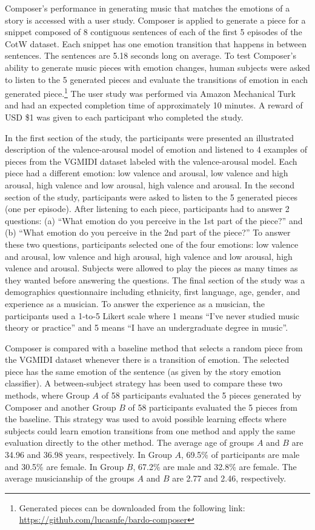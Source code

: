 Composer's performance in generating music that matches the emotions of a story is accessed with a user study. Composer is applied to generate a piece for a snippet composed of 8 contiguous sentences of each of the first 5 episodes of the CotW dataset. Each snippet has one emotion transition that happens in between sentences. The sentences are 5.18 seconds long on average. To test Composer's ability to generate music pieces with emotion changes, human subjects were asked to listen to the 5 generated pieces and evaluate the transitions of emotion in each generated piece.\footnote{Generated pieces can be downloaded from the following link: \url{https://github.com/lucasnfe/bardo-composer}} The user study was performed via Amazon Mechanical Turk and had an expected completion time of approximately 10 minutes. A reward of USD \$1 was given to each participant who completed the study.

In the first section of the study, the participants were presented an illustrated description of the valence-arousal model of emotion and listened to 4 examples of pieces from the VGMIDI dataset labeled with the valence-arousal model. Each piece had a different emotion: low valence and arousal, low valence and high arousal, high valence and low arousal, high valence and arousal. In the second section of the study, participants were asked to listen to the 5 generated pieces (one per episode). After listening to each piece, participants had to answer 2 questions: (a) ``What emotion do you perceive in the 1st part of the piece?'' and (b) ``What emotion do you perceive in the 2nd part of the piece?'' To answer these two questions, participants selected one of the four emotions: low valence and arousal, low valence and high arousal, high valence and low arousal, high valence and arousal. Subjects were allowed to play the pieces as many times as they wanted before answering the questions.
The final section of the study was a demographics questionnaire including ethnicity, first language, age, gender, and experience as a musician. To answer the experience as a musician, the participants used a 1-to-5 Likert scale where 1 means ``I've never studied music theory or practice'' and 5 means ``I have an undergraduate degree in music''.

Composer is compared with a baseline method that selects a random piece from the VGMIDI dataset whenever there is a transition of emotion. The selected piece has the same emotion of the sentence (as given by the story emotion classifier). A between-subject strategy has been used to compare these two methods, where Group $A$ of 58 participants evaluated the 5 pieces generated by Composer and another Group $B$ of 58 participants evaluated the 5 pieces from the baseline. This strategy was used to avoid possible learning effects where subjects could learn emotion transitions from one method and apply the same evaluation directly to the other method. The average age of groups $A$ and $B$ are 34.96 and 36.98 years, respectively. In Group $A$, 69.5\% of participants are male and 30.5\% are female. In Group $B$, 67.2\% are male and 32.8\% are female. The average musicianship of the groups $A$ and $B$ are 2.77 and 2.46, respectively.

